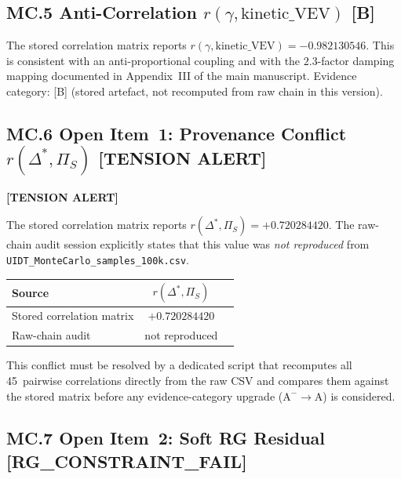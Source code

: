\subsection*{MC.5 Anti-Correlation $r(\gamma, \text{kinetic\_VEV})$
  \textnormal{\textmd{[B]}}}

The stored correlation matrix reports
$r(\gamma, \text{kinetic\_VEV}) = -0.982130546$.
This is consistent with an anti-proportional coupling and with the $2.3$-factor
damping mapping documented in Appendix~III of the main manuscript.
Evidence category: [B] (stored artefact, not recomputed from raw chain in this version).

\subsection*{MC.6 Open Item~1: Provenance Conflict
  $r(\Delta^*, \Pi_S)$ \textnormal{\textmd{\color{red}[TENSION ALERT]}}}

\textbf{[TENSION ALERT]}

The stored correlation matrix reports
$r(\Delta^*, \Pi_S) = +0.720284420$.
The raw-chain audit session explicitly states that this value was
\emph{not reproduced} from \verb|UIDT_MonteCarlo_samples_100k.csv|.

\begin{center}
\begin{tabular}{lcc}
\hline
Source & $r(\Delta^*, \Pi_S)$ \\
\hline
Stored correlation matrix & $+0.720284420$ \\
Raw-chain audit & not reproduced \\
\hline
\end{tabular}
\end{center}

This conflict must be resolved by a dedicated script that recomputes all
45~pairwise correlations directly from the raw CSV and compares them
against the stored matrix before any evidence-category upgrade
($\mathrm{A}^-\!\to\mathrm{A}$) is considered.

\subsection*{MC.7 Open Item~2: Soft RG Residual
  \textnormal{\textmd{\color{red}[RG\_CONSTRAINT\_FAIL]}}}

